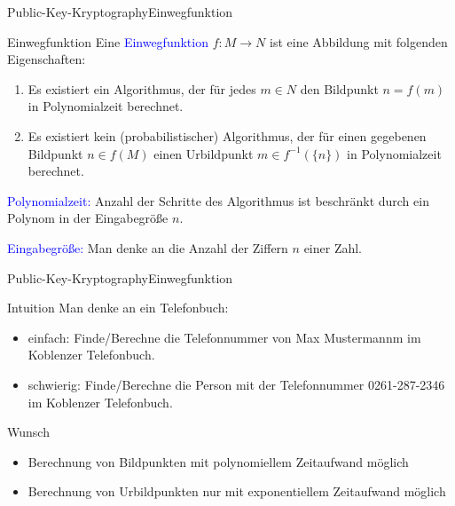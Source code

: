 \documentclass{beamer}
\newcommand{\tb}[1]{{\textcolor{blue}{#1}}}
\theoremstyle{plain}
\begin{document}
\begin{frame}{Public-Key-Kryptography}{Einwegfunktion}
 
 \begin{block}{Einwegfunktion}
  Eine \tb{Einwegfunktion} $f: M \rightarrow N$ ist eine Abbildung mit folgenden Eigenschaften:
  \begin{enumerate}
   \item Es existiert ein Algorithmus, der für jedes $m \in N$ den Bildpunkt $n = f(m)$ in Polynomialzeit berechnet.
   \item Es existiert kein (probabilistischer) Algorithmus, der für einen gegebenen Bildpunkt $n \in f(M)$ einen Urbildpunkt $m \in f^{-1}(\{n\})$ in Polynomialzeit berechnet. 
  \end{enumerate}
  \end{block}
  
  \pause
  \vspace{0.5cm}
  
   \tb{Polynomialzeit:} Anzahl der Schritte des Algorithmus ist beschränkt durch ein Polynom in der Eingabegröße $n$.
   
   \tb{Eingabegröße:} Man denke an die Anzahl der Ziffern $n$ einer Zahl.
   

\end{frame}

\begin{frame}{Public-Key-Kryptography}{Einwegfunktion}
 
\begin{block}{Intuition}
 Man denke an ein Telefonbuch:
 \begin{itemize}
  \item einfach: Finde/Berechne die Telefonnummer von Max Mustermannm im Koblenzer Telefonbuch.
  \item schwierig: Finde/Berechne die Person mit der Telefonnummer 0261-287-2346 im Koblenzer Telefonbuch.
 \end{itemize}
\end{block}

\pause

 \begin{block}{Wunsch}
 \begin{itemize}
  \item Berechnung von Bildpunkten mit polynomiellem Zeitaufwand möglich
  \item Berechnung von Urbildpunkten nur mit exponentiellem Zeitaufwand möglich
 \end{itemize}
\end{block}

\end{frame}
\end{document}

